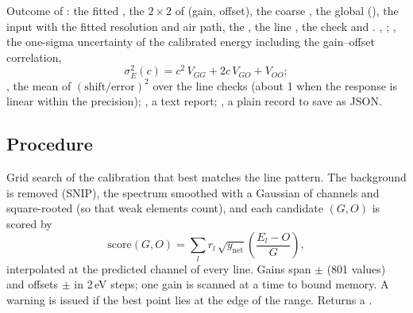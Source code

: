 Outcome of : the fitted , the $2\times2$  of
(gain, offset), the coarse , the global  (), the input
 with the fitted resolution and air path, the , the line
, the  check and .
 , ; , the one-sigma
uncertainty of the calibrated energy including the gain--offset correlation,
\begin{equation}
  \sigma_E^2(c) = c^2\,V_{GG} + 2c\,V_{GO} + V_{OO};
\end{equation}
, the mean of $(\text{shift}/\text{error})^2$ over the line checks (about 1
when the response is linear within the precision); , a text report;
, a plain record to save as JSON.

\subsection{Procedure}

Grid search of the calibration that best matches the line pattern. The background is removed
(SNIP), the spectrum smoothed with a Gaussian of  channels and square-rooted (so
that weak elements count), and each candidate $(G, O)$ is scored by
\begin{equation}
  \mathrm{score}(G,O) = \sum_l r_l\,\sqrt{y_\mathrm{net}}\!\left(\frac{E_l-O}{G}\right),
\end{equation}
interpolated at the predicted channel of every line. Gains span $\pm$
(801 values) and offsets $\pm$ in 2\,eV steps; one gain is scanned at
a time to bound memory. A warning is issued if the best point lies at the edge of the range.
Returns a .

